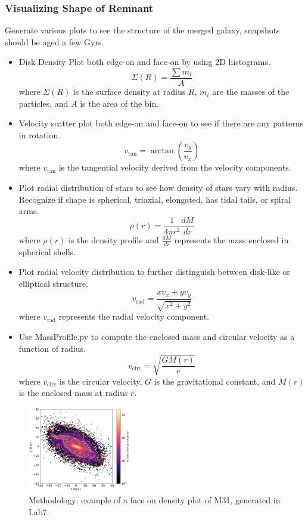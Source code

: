 \documentclass[usenatbib]{mnras}
\begin{document}
\subsubsection{Visualizing Shape of Remnant}
Generate various plots to see the structure of the merged galaxy, snapshots should be aged a few Gyrs. 
\begin{itemize}
    \item Disk Density Plot both edge-on and face-on by using 2D histograms.
    \[
    \Sigma(R) = \frac{\sum m_i}{A}
    \]
    where \( \Sigma(R) \) is the surface density at radius \( R \), \( m_i \) are the masses of the particles, and \( A \) is the area of the bin.
    
    \item Velocity scatter plot both edge-on and face-on to see if there are any patterns in rotation.
    \[
    v_{\text{tan}} = \arctan\left(\frac{v_y}{v_x}\right)
    \]
    where \( v_{\text{tan}} \) is the tangential velocity derived from the velocity components.

    \item Plot radial distribution of stars to see how density of stars vary with radius. Recognize if shape is spherical, triaxial, elongated, has tidal tails, or spiral arms.
    \[
    \rho(r) = \frac{1}{4\pi r^2} \frac{dM}{dr}
    \]
    where \( \rho(r) \) is the density profile and \( \frac{dM}{dr} \) represents the mass enclosed in spherical shells.

    \item Plot radial velocity distribution to further distinguish between disk-like or elliptical structure.
    \[
    v_{\text{rad}} = \frac{x v_x + y v_y}{\sqrt{x^2 + y^2}}
    \]
    where \( v_{\text{rad}} \) represents the radial velocity component.

    \item Use MassProfile.py to compute the enclosed mass and circular velocity as a function of radius.
    \[
    v_{\text{circ}} = \sqrt{\frac{G M(r)}{r}}
    \]
    where \( v_{\text{circ}} \) is the circular velocity, \( G \) is the gravitational constant, and \( M(r) \) is the enclosed mass at radius \( r \).
\end{itemize}

\begin{figure}[h]
    \centering
    \includegraphics[width=0.4\textwidth]{Example Face On Density Plot.png}
    \caption{Methodology: example of a face on density plot of M31, generated in Lab7.}
    \label{fig:method}
\end{figure}
\end{document}
